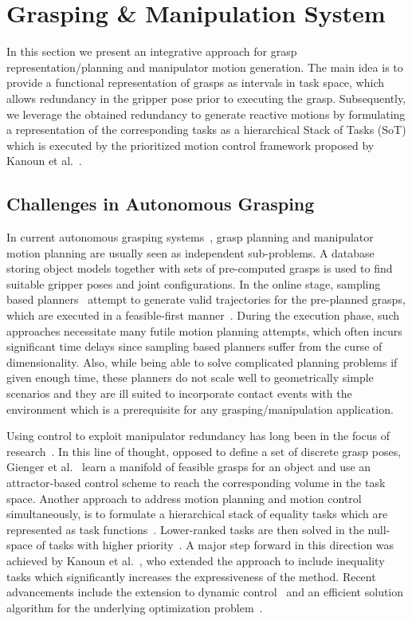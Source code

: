 
\section{Grasping \& Manipulation System}
\label{sec:manip}
%
In this section we present an integrative approach for grasp representation/planning and manipulator
motion generation. The main idea is to provide a functional representation of grasps as intervals in
task space, which allows redundancy in the gripper pose prior to executing the grasp. Subsequently,
we leverage the obtained redundancy to generate reactive motions by formulating a representation of
the corresponding tasks as a hierarchical Stack of Tasks (SoT) which is executed by the prioritized
motion control framework proposed by Kanoun et al.~\cite{Kano11}.
%
\subsection{Challenges in Autonomous Grasping}
\label{subsec:Grasping_challenges}
%
In current autonomous grasping systems~\cite{Bere07, Srin10, Krug14a}, grasp planning and
manipulator motion planning are usually seen as independent sub-problems. A database storing object
models together with sets of pre-computed grasps is used to find suitable gripper poses and joint
configurations. In the online stage, sampling based planners~\cite{LaVa06} attempt to generate valid
trajectories for the pre-planned grasps, which are executed in a feasible-first
manner~\cite{Bere07}. During the execution phase, such approaches necessitate many futile motion
planning attempts, which often incurs significant time delays since sampling based planners suffer
from the curse of dimensionality. Also, while being able to solve complicated planning problems if
given enough time, these planners do not scale well to geometrically simple scenarios and they are
ill suited to incorporate contact events with the environment which is a prerequisite for any
grasping/manipulation application.

Using control to exploit manipulator redundancy has long been in the focus of research~\cite{Sici91,
  Sent10}. In this line of thought, opposed to define a set of discrete grasp poses, Gienger et
al.~\cite{Gien08a, Gien08b} learn a manifold of feasible grasps for an object and use an
attractor-based control scheme to reach the corresponding volume in the task space. Another approach
to address motion planning and motion control simultaneously, is to formulate a hierarchical stack
of equality tasks which are represented as task functions~\cite{Sams91}. Lower-ranked tasks are then
solved in the null-space of tasks with higher priority~\cite{Sici91, Sent10}. A major step forward
in this direction was achieved by Kanoun et al.~\cite{Kano11}, who extended the approach to include
inequality tasks which significantly increases the expressiveness of the method. Recent advancements
include the extension to dynamic control~\cite{Saab13} and an efficient solution algorithm for the
underlying optimization problem~\cite{Esca14}.
%
